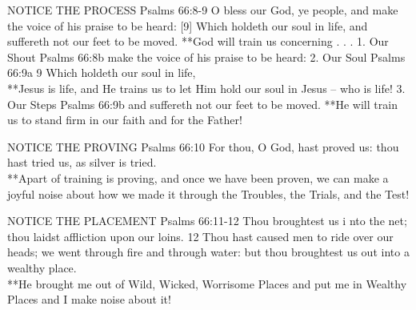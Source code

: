 \begin{compactenum}[I.][5]
    \begin{compactenum}[A.]
        \item NOTICE THE PROCESS 
Psalms 66:8-9  O bless our God, ye people, and make the voice of his praise to be heard: [9] Which holdeth our soul in life, and suffereth not our feet to be moved. 
**God will train us concerning . . .
            1.  Our Shout
Psalms 66:8b  make the voice of his praise to be heard:  
            2.  Our Soul
Psalms 66:9a 9 Which holdeth our soul in life,  \\
**Jesus is life, and He trains us to let Him hold our soul in Jesus – who is life!
            3.  Our Steps
Psalms 66:9b and suffereth not our feet to be moved. 
**He will train us to stand firm in our faith and for the Father!
        \item NOTICE THE PROVING 
Psalms 66:10  For thou, O God, hast proved us: thou hast tried us, as silver is tried. \\
**Apart of training is proving, and once we have been proven, we can make a joyful noise about how we made it through the Troubles, the Trials, and the Test!
        \item NOTICE THE PLACEMENT
Psalms 66:11-12  Thou broughtest us i nto the net; thou laidst affliction upon our loins. 12 Thou hast caused men to ride over our heads; we went through fire and through water: but thou broughtest us out into a wealthy place.\\
**He brought me out of Wild, Wicked, Worrisome Places and put me in Wealthy Places and I make noise about it!
    \end{compactenum}


\end{compactenum}
